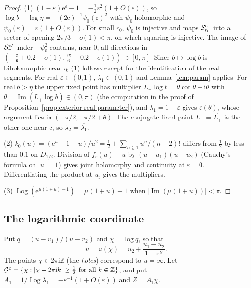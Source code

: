 \documentclass[11pt]{amsart}
\theoremstyle{definition}
\newcommand{\eee}{\mathrm{e}}
\newcommand{\ii}{\mathrm{i}}
\begin{document}
\begin{proof}
(1) $(1-\varepsilon)\eee^{\varepsilon}-1=-\tfrac12\varepsilon^2(1+O(\varepsilon))$, so
$\log b-\log\eta=-(2\eee)^{-1}\psi_0(\varepsilon)^2$ with $\psi_0$ holomorphic and
$\psi_0(\varepsilon)=\varepsilon(1+O(\varepsilon))$.  For small $r_0$, $\psi_0$ is injective and
maps $\mathcal S^{\rm c}_{r_0}$ into a sector of opening $2\pi/3+o(1)<\pi$, on which
squaring is injective.  The image of $\mathcal S^{\rm c\prime}_r$ under $-\psi_0^2$
contains, near $0$, all directions in $(-\tfrac\pi6+0.2+o(1),\tfrac{7\pi}6-0.2-o(1))\supset[0,\pi]$.
Since $b\mapsto\log b$ is biholomorphic near $\eta$, (1) follows except for
the identification of the real segments.  For real $\varepsilon\in(0,1)$,
$\lambda_1\in(0,1)$ and Lemma~\ref{lem:param} applies.  For real $b>\eta$ the upper
fixed point has multiplier $L_+\log b=\theta\cot\theta+\ii\theta$ with
$\theta=\operatorname{Im}(L_+\log b)\in(0,\pi)$ (the computation in the proof of
Proposition~\ref{prop:exterior-real-parameter}), and $\lambda_1=1-\varepsilon$ gives
$\varepsilon(\theta)$, whose argument lies in $(-\pi/2,-\pi/2+\theta)$.  The conjugate
fixed point $L_-=\overline{L_+}$ is the other one near $\eee$, so
$\lambda_2=\overline{\lambda_1}$.

(2) $k_0(u)=(\eee^u-1-u)/u^2=\tfrac12+\sum_{n\ge1}u^n/(n+2)!$ differs from
$\tfrac12$ by less than $0.1$ on $D_{1/2}$.  Division of $f_\varepsilon(u)-u$ by
$(u-u_1)(u-u_2)$ (Cauchy's formula on $|u|=1$) gives joint holomorphy and
continuity at $\varepsilon=0$.  Differentiating the product at $u_j$ gives the
multipliers.

(3) $\operatorname{Log}(\eee^{\mu(1+u)-1})=\mu(1+u)-1$ when $|\operatorname{Im}(\mu(1+u))|<\pi$.
\end{proof}

\subsection{The logarithmic coordinate}
Put $q=(u-u_1)/(u-u_2)$ and $\chi=\log q$, so that
\[
 u=u(\chi)=u_2+\frac{u_1-u_2}{1-\eee^{\chi}} .
\]
The points $\chi\in2\pi\ii\mathbb Z$ (the \emph{holes}) correspond to $u=\infty$.
Let $\mathcal G^{\rm c}=\{\chi:|\chi-2\pi\ii k|\ge\tfrac12\ \text{for all }k\in\mathbb Z\}$, and put
$A_1=1/\operatorname{Log}\lambda_1=-\varepsilon^{-1}(1+O(\varepsilon))$ and $Z=A_1\chi$.
\end{document}
